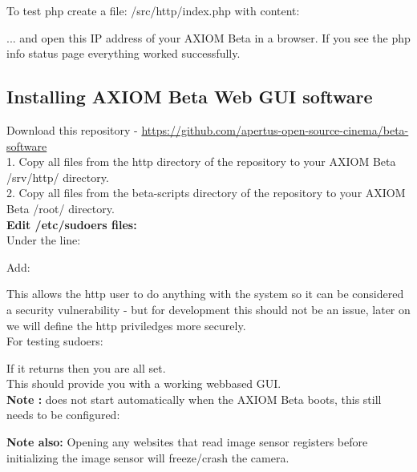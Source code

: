 To test php create a file: /src/http/index.php with content:

    
... and open this IP address of your AXIOM Beta in a browser. If you see the php info status page everything worked successfully.     






\subsection{Installing AXIOM Beta Web GUI software}

Download this repository - \href{https://github.com/apertus-open-source-cinema/beta-software}{https://github.com/apertus-open-source-cinema/beta-software}\\

1. Copy all files from the http directory of the repository to your AXIOM Beta /srv/http/ directory.\\
2. Copy all files from the beta-scripts directory of the repository to your AXIOM Beta /root/ directory.\\ 

\textbf{Edit /etc/sudoers files:}\\

Under the line: 


Add:


This allows the http user to do anything with the system so it can be considered a security vulnerability - but for development this should not be an issue, later on we will define the http priviledges more securely.\\

For testing sudoers: 


If it returns  then you are all set.\\

This should provide you with a working webbased GUI.\\

\textbf{Note :}  does not start automatically when the AXIOM Beta boots, this still needs to be configured: 


\textbf{Note also:} Opening any websites that read image sensor registers before initializing the image sensor  will freeze/crash the camera. 